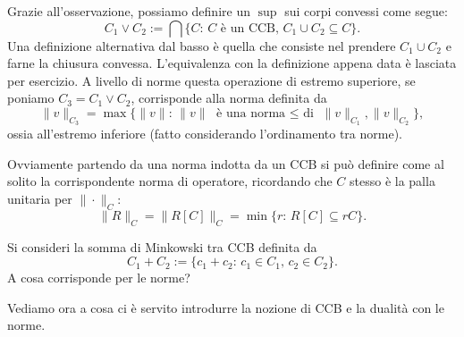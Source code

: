 Grazie all'osservazione, possiamo definire un $\sup$ sui corpi convessi come segue:
$$C_{1}\vee C_{2}:=\bigcap \{C:\, C\text{ è un CCB},\, C_{1}\cup C_{2}\subseteq C\}.$$
Una definizione alternativa dal basso è quella che consiste nel prendere $C_{1}\cup C_{2}$ e farne la chiusura convessa. L'equivalenza con la definizione appena data è lasciata per esercizio. 
A livello di norme questa operazione di estremo superiore, se poniamo $C_{3} = C_{1}\vee C_{2}$, corrisponde alla norma definita da 
$$\|v\|_{C_{3}} = \max\{\|v\|:\,\|v\|\text{ è una norma $\leq$ di } \|v\|_{C_{1}}, \|v\|_{C_{2}}\},$$
ossia all'estremo inferiore (fatto considerando l'ordinamento tra norme).

Ovviamente partendo da una norma indotta da un CCB si può definire come al solito la corrispondente norma di operatore, ricordando che $C$ stesso è la palla unitaria per $\|\cdot\|_{C}$:
$$\|R\|_{C} = \|R[C]\|_{C} = \min\{r:\,R[C]\subseteq rC\}.$$

\begin{esercizio}[carino]
	Si consideri la somma di Minkowski tra CCB definita da 
	$$C_{1} + C_{2} := \{c_{1} + c_{2}:\, c_{1}\in C_{1},\, c_{2}\in C_{2}\}.$$
	A cosa corrisponde per le norme?
\end{esercizio}

Vediamo ora a cosa ci è servito introdurre la nozione di CCB e la dualità con le norme.

